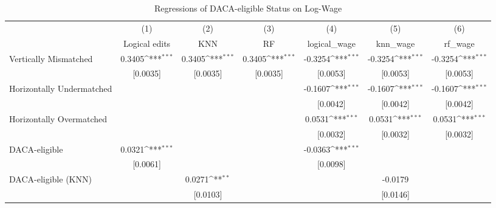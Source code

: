 \begin{table}[htbp]\centering
\def\sym#1{\ifmmode^{#1}\else\(^{#1}\)\fi}
\caption{Regressions of DACA-eligible Status on Log-Wage}
\begin{tabular}{l*{6}{c}}
\toprule
                    &\multicolumn{1}{c}{(1)}         &\multicolumn{1}{c}{(2)}         &\multicolumn{1}{c}{(3)}         &\multicolumn{1}{c}{(4)}         &\multicolumn{1}{c}{(5)}         &\multicolumn{1}{c}{(6)}         \\
                    &Logical edits         &         KNN         &          RF         &logical\_wage         &    knn\_wage         &     rf\_wage         \\
\midrule
Vertically Mismatched&      0.3405\sym{***}&      0.3405\sym{***}&      0.3405\sym{***}&     -0.3254\sym{***}&     -0.3254\sym{***}&     -0.3254\sym{***}\\
                    &    [0.0035]         &    [0.0035]         &    [0.0035]         &    [0.0053]         &    [0.0053]         &    [0.0053]         \\
\addlinespace
Horizontally Undermatched&                     &                     &                     &     -0.1607\sym{***}&     -0.1607\sym{***}&     -0.1607\sym{***}\\
                    &                     &                     &                     &    [0.0042]         &    [0.0042]         &    [0.0042]         \\
\addlinespace
Horizontally Overmatched&                     &                     &                     &      0.0531\sym{***}&      0.0531\sym{***}&      0.0531\sym{***}\\
                    &                     &                     &                     &    [0.0032]         &    [0.0032]         &    [0.0032]         \\
\addlinespace
DACA-eligible       &      0.0321\sym{***}&                     &                     &     -0.0363\sym{***}&                     &                     \\
                    &    [0.0061]         &                     &                     &    [0.0098]         &                     &                     \\
\addlinespace
DACA-eligible (KNN) &                     &      0.0271\sym{**} &                     &                     &     -0.0179         &                     \\
                    &                     &    [0.0103]         &                     &                     &    [0.0146]         &                     \\

\end{tabular}
\end{table}
